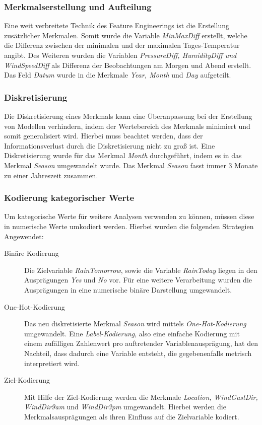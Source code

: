 \subsubsection{Merkmalserstellung und Aufteilung}
Eine weit verbreitete Technik des Feature Engineerings ist die Erstellung zusätzlicher Merkmalen. Somit wurde die Variable \emph{MinMaxDiff} erstellt, welche die Differenz zwischen der minimalen und der maximalen Tages-Temperatur angibt. Des Weiteren wurden die Variablen \emph{PressureDiff, HumidityDiff und WindSpeedDiff} als Differenz der Beobachtungen am Morgen und Abend erstellt. Das Feld \emph{Datum} wurde in die Merkmale \emph{Year, Month} und \emph{Day} aufgeteilt.

\subsubsection{Diskretisierung}
Die Diskretisierung eines Merkmals kann eine Überanpassung bei der Erstellung von Modellen verhindern, indem der Wertebereich des Merkmals minimiert und somit generalisiert wird. Hierbei muss beachtet werden, dass der Informationsverlust durch die Diskretisierung nicht zu groß ist. Eine Diskretisierung wurde für das Merkmal \emph{Month} durchgeführt, indem es in das Merkmal \emph{Season} umgewandelt wurde. Das Merkmal \emph{Season} fasst immer 3 Monate zu einer Jahreszeit zusammen.

\subsubsection{Kodierung kategorischer Werte}
Um kategorische Werte für weitere Analysen verwenden zu können, müssen diese in numerische Werte umkodiert werden. Hierbei wurden die folgenden Strategien Angewendet:
\begin{description}
	\item[Binäre Kodierung]
	Die Zielvariable \emph{RainTomorrow}, sowie die Variable \emph{RainToday} liegen in den Ausprägungen \emph{Yes} und \emph{No} vor. Für eine weitere Verarbeitung wurden die Ausprägungen in eine numerische binäre Darstellung umgewandelt.
	\item[One-Hot-Kodierung]
	Das neu diskretisierte Merkmal \emph{Season} wird mittels \emph{One-Hot-Kodierung} umgewandelt. Eine \emph{Label-Kodierung}, also eine einfache Kodierung mit einem zufälligen Zahlenwert pro auftretender Variablenausprägung, hat den Nachteil, dass dadurch eine Variable entsteht, die gegebenenfalls metrisch interpretiert wird.
	\item[Ziel-Kodierung]
	Mit Hilfe der Ziel-Kodierung werden die Merkmale \emph{Location, WindGustDir, WindDir9am} und \emph{WindDir3pm} umgewandelt. Hierbei werden die Merkmalsausprägungen als ihren Einfluss auf die Zielvariable kodiert.
\end{description}

